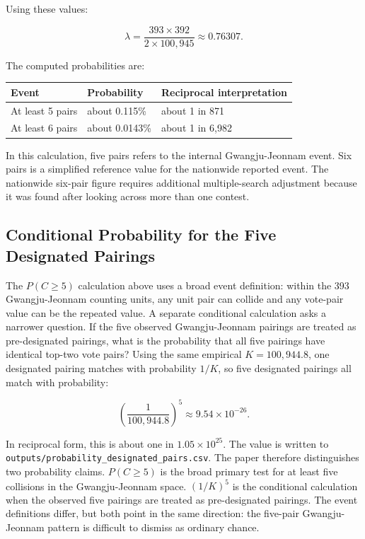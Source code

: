 \documentclass[preprint]{IEIE}
\begin{document}
Using these values:

\[
\lambda = \frac{393 \times 392}{2 \times 100,945} \approx 0.76307.
\]

The computed probabilities are:

\begin{center}
\small
\begin{tabular}{l l l}
\toprule
Event & Probability & Reciprocal interpretation \\
\midrule
At least 5 pairs & about 0.115\% & about 1 in 871 \\
At least 6 pairs & about 0.0143\% & about 1 in 6,982 \\
\bottomrule
\end{tabular}
\end{center}

In this calculation, five pairs refers to the internal Gwangju-Jeonnam event. Six pairs is a simplified reference value for the nationwide reported event. The nationwide six-pair figure requires additional multiple-search adjustment because it was found after looking across more than one contest.

\subsection{Conditional Probability for the Five Designated Pairings}

The \(P(C \geq 5)\) calculation above uses a broad event definition: within the 393 Gwangju-Jeonnam counting units, any unit pair can collide and any vote-pair value can be the repeated value. A separate conditional calculation asks a narrower question. If the five observed Gwangju-Jeonnam pairings are treated as pre-designated pairings, what is the probability that all five pairings have identical top-two vote pairs? Using the same empirical \(K=100,944.8\), one designated pairing matches with probability \(1/K\), so five designated pairings all match with probability:

\[
\left(\frac{1}{100,944.8}\right)^5 \approx 9.54 \times 10^{-26}.
\]

In reciprocal form, this is about one in \(1.05\times 10^{25}\). The value is written to \texttt{outputs/probability\_designated\_pairs.csv}. The paper therefore distinguishes two probability claims. \(P(C \geq 5)\) is the broad primary test for at least five collisions in the Gwangju-Jeonnam space. \((1/K)^5\) is the conditional calculation when the observed five pairings are treated as pre-designated pairings. The event definitions differ, but both point in the same direction: the five-pair Gwangju-Jeonnam pattern is difficult to dismiss as ordinary chance.
\end{document}
